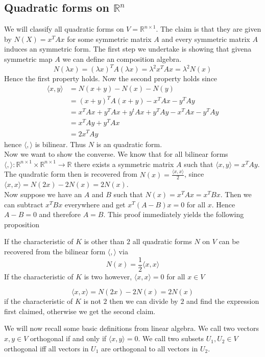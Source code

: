 \documentclass[../Thesis.tex]{subfiles}
\begin{document}
\subsection{Quadratic forms on $\mathbb{R}^n$}
We will classify all quadratic forms on $V = \mathbb{R}^{n \times 1}$. The claim is that they are given by $N(X) = x^T A x$ for some symmetric matrix $A$ and every symmetric matrix $A$ induces an symmetric form. The first step we undertake is showing that givena symmetric map $A$ we can define an composition algebra.
\begin{equation}
N(\lambda x) = (\lambda x) ^T A (\lambda x) = \lambda^2 x^T A x = \lambda^2 N(x)
\end{equation}
Hence the first property holds. Now the second property holds since
\begin{align}
\langle x, y \rangle &=  N( x + y) - N(x) - N(y) \\
                     &= (x + y)^T A(x + y) - x^TAx - y^TAy\\
                     &= x^TAx + y^TAx + y^tAx + y^TAy -x^TAx - y^TAy\\
                     &=x^TAy + y^TAx \\
                     &=2x^TAy
\end{align}
hence $\langle , \rangle$ is bilinear. Thus $N$ is an quadratic form.
\\Now we want to show the converse. We know that for all bilinear forms $ \langle , \rangle :\mathbb{R}^{n \times 1} \times \mathbb{R}^{n \times 1} \rightarrow \mathbb{R}$ there exists a symmetric matrix $A$ such that $\langle x, y\rangle = x^TAy$. The quadratic form then is recovered from $N(x) = \frac{\langle x, x\rangle}{2}$, since $\langle x, x\rangle = N(2x) - 2N(x) = 2N(x)$.
\\Now suppose we have an $A$ and $B$ such that $N(x) = x^TAx = x^TBx$. Then we can subtract $x^TBx$ everywhere and get $x^T(A-B)x = 0$ for all $x$. Hence $A-B = 0$ and therefore $A = B$.
This proof immediately yields the following proposition
\begin{prop}
If the characteristic of $K$ is other than $2$ all quadratic forms $N$ on $V$ can be recovered from the bilinear form $\langle , \rangle$ via 
\begin{equation}
N(x) = \frac{1}{2}\langle x, x \rangle
\end{equation}
If the characteristic of $K$ is two however, $\langle x, x \rangle = 0$ for all $x \in V$
\end{prop}

\begin{myproof}
\begin{equation}
\langle x, x \rangle = N(2x)- 2N(x) = 2N(x)
\end{equation}
if the characteristic of $K$ is not $2$ then we can divide by $2$ and find the expression first claimed, otherwise we get the second claim.
\end{myproof}

We will now recall some basic definitions from linear algebra. We call two vectors $x,y \in V$ orthogonal if and only if $\langle x,y \rangle =0$. We call two subsets $U_1, U_2 \in V$ orthogonal iff all vectors in $U_1$ are orthogonal to all vectors in $U_2$.
\end{document}
